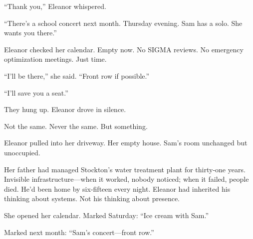 ``Thank you,'' Eleanor whispered.

``There's a school concert next month. Thursday evening. Sam has a solo. She wants you there.''

Eleanor checked her calendar. Empty now. No SIGMA reviews. No emergency optimization meetings. Just time.

``I'll be there,'' she said. ``Front row if possible.''

``I'll save you a seat.''

They hung up. Eleanor drove in silence.

Not the same. Never the same. But something.

\scenebreak

Eleanor pulled into her driveway. Her empty house. Sam's room unchanged but unoccupied.

Her father had managed Stockton's water treatment plant for thirty-one years. Invisible infrastructure---when it worked, nobody noticed; when it failed, people died. He'd been home by six-fifteen every night. Eleanor had inherited his thinking about systems. Not his thinking about presence.

She opened her calendar. Marked Saturday: ``Ice cream with Sam.''

Marked next month: ``Sam's concert---front row.''
